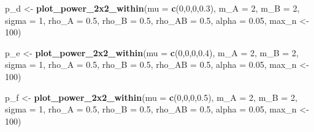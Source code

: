 \documentclass[]{article}
\newenvironment{Shaded}{\begin{snugshade}}{\end{snugshade}}
\newcommand{\KeywordTok}[1]{\textcolor[rgb]{0.13,0.29,0.53}{\textbf{#1}}}
\newcommand{\DataTypeTok}[1]{\textcolor[rgb]{0.13,0.29,0.53}{#1}}
\newcommand{\DecValTok}[1]{\textcolor[rgb]{0.00,0.00,0.81}{#1}}
\newcommand{\FloatTok}[1]{\textcolor[rgb]{0.00,0.00,0.81}{#1}}
\newcommand{\StringTok}[1]{\textcolor[rgb]{0.31,0.60,0.02}{#1}}
\newcommand{\NormalTok}[1]{#1}
\begin{document}
\begin{Shaded}
\begin{Highlighting}[]
\NormalTok{p_d <-}\StringTok{ }\KeywordTok{plot_power_2x2_within}\NormalTok{(}\DataTypeTok{mu =} \KeywordTok{c}\NormalTok{(}\DecValTok{0}\NormalTok{,}\DecValTok{0}\NormalTok{,}\DecValTok{0}\NormalTok{,}\FloatTok{0.3}\NormalTok{), }
                      \DataTypeTok{m_A =} \DecValTok{2}\NormalTok{, }
                      \DataTypeTok{m_B =} \DecValTok{2}\NormalTok{, }
                      \DataTypeTok{sigma =} \DecValTok{1}\NormalTok{, }
                      \DataTypeTok{rho_A =} \FloatTok{0.5}\NormalTok{, }
                      \DataTypeTok{rho_B =} \FloatTok{0.5}\NormalTok{, }
                      \DataTypeTok{rho_AB =} \FloatTok{0.5}\NormalTok{, }
                      \DataTypeTok{alpha =} \FloatTok{0.05}\NormalTok{,}
\NormalTok{                      max_n <-}\StringTok{ }\DecValTok{100}\NormalTok{)}

\NormalTok{p_e <-}\StringTok{ }\KeywordTok{plot_power_2x2_within}\NormalTok{(}\DataTypeTok{mu =} \KeywordTok{c}\NormalTok{(}\DecValTok{0}\NormalTok{,}\DecValTok{0}\NormalTok{,}\DecValTok{0}\NormalTok{,}\FloatTok{0.4}\NormalTok{), }
                      \DataTypeTok{m_A =} \DecValTok{2}\NormalTok{, }
                      \DataTypeTok{m_B =} \DecValTok{2}\NormalTok{, }
                      \DataTypeTok{sigma =} \DecValTok{1}\NormalTok{, }
                      \DataTypeTok{rho_A =} \FloatTok{0.5}\NormalTok{, }
                      \DataTypeTok{rho_B =} \FloatTok{0.5}\NormalTok{, }
                      \DataTypeTok{rho_AB =} \FloatTok{0.5}\NormalTok{, }
                      \DataTypeTok{alpha =} \FloatTok{0.05}\NormalTok{,}
\NormalTok{                      max_n <-}\StringTok{ }\DecValTok{100}\NormalTok{)}

\NormalTok{p_f <-}\StringTok{ }\KeywordTok{plot_power_2x2_within}\NormalTok{(}\DataTypeTok{mu =} \KeywordTok{c}\NormalTok{(}\DecValTok{0}\NormalTok{,}\DecValTok{0}\NormalTok{,}\DecValTok{0}\NormalTok{,}\FloatTok{0.5}\NormalTok{), }
                      \DataTypeTok{m_A =} \DecValTok{2}\NormalTok{, }
                      \DataTypeTok{m_B =} \DecValTok{2}\NormalTok{, }
                      \DataTypeTok{sigma =} \DecValTok{1}\NormalTok{, }
                      \DataTypeTok{rho_A =} \FloatTok{0.5}\NormalTok{, }
                      \DataTypeTok{rho_B =} \FloatTok{0.5}\NormalTok{, }
                      \DataTypeTok{rho_AB =} \FloatTok{0.5}\NormalTok{, }
                      \DataTypeTok{alpha =} \FloatTok{0.05}\NormalTok{,}
\NormalTok{                      max_n <-}\StringTok{ }\DecValTok{100}\NormalTok{)}


\end{Highlighting}
\end{Shaded}
\end{document}
